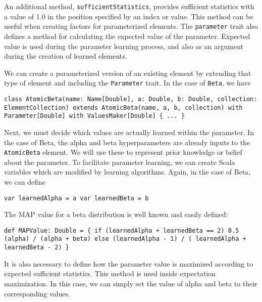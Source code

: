 An additional method,  \texttt{sufficientStatistics}, provides sufficient statistics with a value of 1.0 in the position specified by an index or value. This method can be useful when creating factors for parameterized elements. The \texttt{parameter} trait also defines a method for calculating the expected value of the parameter. Expected value is used during the parameter learning process, and also as an argument during the creation of learned elements.

We can create a parameterized version of an existing element by extending that type of element and including the \texttt{Parameter} trait. In the case of \texttt{Beta}, we have

\begin{flushleft}
\texttt{class AtomicBeta(name: Name[Double], a: Double, b: Double, collection: ElementCollection) extends AtomicBeta(name, a, b, collection) with
Parameter[Double] with ValuesMaker[Double] \{ ... \}
}
\end{flushleft}

Next, we must decide which values are actually learned within the parameter. In the case of Beta, the alpha and beta hyperparameters are already inputs to the \texttt{AtomicBeta} element. We will use these to represent prior knowledge or belief about the parameter. To facilitate parameter learning, we can create Scala variables which are modified by learning algorithms. Again, in the case of Beta, we can define

\begin{flushleft}
\texttt{var learnedAlpha = a 
\newline var learnedBeta = b
}
\end{flushleft}

The MAP value for a beta distribution is well known and easily defined:

\begin{flushleft}
\texttt{def MAPValue: Double = \{
\newline \tab if (learnedAlpha + learnedBeta == 2) 0.5 (alpha) / (alpha + beta)
\newline \tab else (learnedAlpha - 1) / ( learnedAlpha  + learnedBeta - 2)
\newline \}
}
\end{flushleft}

It is also necessary to define how the parameter value is maximized according to expected sufficient statistics. This method is used inside expectation maximization. In this case, we can simply set the value of alpha and beta to their corresponding values.

